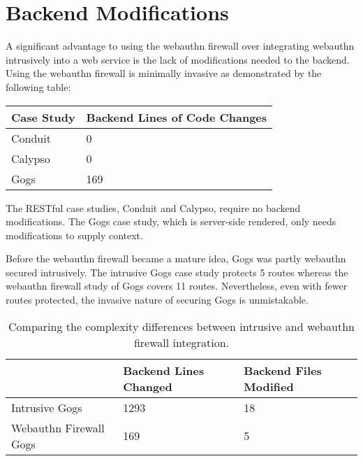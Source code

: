 
\section{Backend Modifications}\label{Sec:BackendModifications}

A significant advantage to using the webauthn firewall over integrating webauthn intrusively into a web service is the lack of modifications needed to the backend. Using the webauthn firewall is minimally invasive as demonstrated by the following table:

\begin{table}[h]
\centering

\begin{tabular}{ m{4.5cm} m{6cm}  } 
 \hline
 Case Study & Backend Lines of Code Changes \\ 
 \hline \hline

 Conduit & 0 \\ \hline

 Calypso & 0 \\ \hline

 Gogs & 169 \\ \hline

\end{tabular}
\end{table}

The RESTful case studies, Conduit and Calypso, require no backend modifications. The Gogs case study, which is server-side rendered, only needs modifications to supply context. 

Before the webauthn firewall became a mature idea, Gogs was partly webauthn secured intrusively. The intrusive Gogs case study protects 5 routes whereas the webauthn firewall study of Gogs covers 11 routes. Nevertheless, even with fewer routes protected, the invasive nature of securing Gogs is unmistakable.

\begin{table}[h]
\centering

\begin{tabular}{ m{5cm} m{4.5cm} m{4.5cm}  } 
 \hline
 & Backend Lines Changed & Backend Files Modified \\ 
 \hline \hline

 Intrusive Gogs & 1293 & 18 \\ \hline

 Webauthn Firewall Gogs & 169 & 5 \\ \hline


\end{tabular}
\caption{Comparing the complexity differences between intrusive and webauthn firewall integration.}
\end{table}

